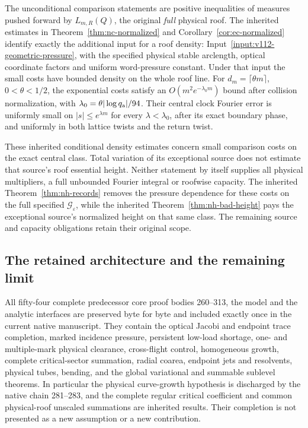 \documentclass[11pt,reqno]{amsart}
\numberwithin{equation}{section}
\theoremstyle{definition}\newtheorem{definition}[theorem]{Definition}
\theoremstyle{remark}\newtheorem{remark}[theorem]{Remark}
\begin{document}
The unconditional comparison statements are positive inequalities
of measures pushed forward by $L_{m,R}(Q)$, the original
\emph{full} physical roof.  The inherited estimates in
Theorem~\ref{thm:nc-normalized} and
Corollary~\ref{cor:ec-normalized} identify exactly the additional
input for a roof density: Input~\ref{input:v112-geometric-pressure},
with the specified physical stable arclength, optical coordinate
factors and uniform word-pressure constant.  Under that input the
small costs have bounded density on the whole roof line.  For
$d_m=\lceil\theta m\rceil$, $0<\theta<1/2$, the exponential
costs satisfy an $O(m^2e^{-\lambda_0m})$ bound after collision
normalization, with
$\lambda_0=\theta|\log q_{\rm a}|/94$.
Their central clock Fourier error is uniformly small on
$|s|\le e^{\lambda m}$ for every $\lambda<\lambda_0$, after its
exact boundary phase, and uniformly in both lattice twists and
the return twist.

These inherited conditional density estimates concern small comparison
costs on the exact central class.  Total variation of its
exceptional source does not estimate that source's roof essential
height.  Neither statement by itself supplies all physical
multipliers, a full unbounded Fourier integral or roofwise capacity.
The inherited Theorem~\ref{thm:nh-records} removes the pressure dependence
for these costs on the full specified $\mathcal G_\varepsilon$,
while the inherited Theorem~\ref{thm:nh-bad-height} pays the exceptional
source's normalized height on that same class.  The remaining
source and capacity obligations retain their original scope.

\subsection*{The retained architecture and the remaining limit}
All fifty-four complete predecessor core proof bodies 260--313,
the model and the analytic interfaces are preserved byte for byte
and included exactly once in the current native manuscript.
They contain the optical Jacobi and endpoint trace completion,
marked incidence pressure, persistent low-load shortage, one- and
multiple-mark physical clearance, cross-flight control, homogeneous
growth, complete critical-sector summation, radial coarea,
endpoint jets and resolvents, physical tubes, bending, and the
global variational and summable sublevel theorems.  In particular
the physical curve-growth hypothesis is discharged by the native
chain 281--283, and the complete regular critical coefficient
and common physical-roof unscaled summations are inherited results.
Their completion is not presented as a new assumption or a new
contribution.
\end{document}
